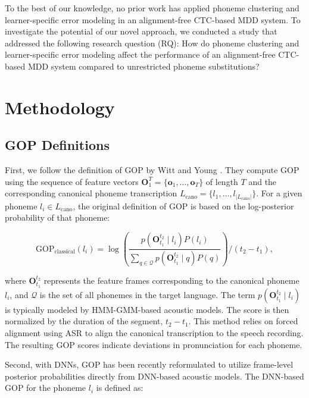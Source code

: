 \documentclass{Interspeech}
\begin{document}
To the best of our knowledge, no prior work has applied phoneme clustering and learner-specific error modeling in an alignment-free CTC-based MDD system. To investigate the potential of our novel approach, we conducted a study that addressed the following research question (RQ): How do phoneme clustering and learner-specific error modeling affect the performance of an alignment-free CTC-based MDD system compared to unrestricted phoneme substitutions?



\section{Methodology}

\subsection{GOP Definitions}
First, we follow the definition of GOP by Witt and Young \cite{witt2000use}. They compute GOP using the sequence of feature vectors \( \mathbf{O}_1^T = \{\mathbf{o}_1, \ldots, \mathbf{o}_T\} \) of length \( T \) and the corresponding canonical phoneme transcription \( L_{\text{cano}} = \{l_1, \ldots, l_{|L_{\text{cano}}|}\} \). For a given phoneme \( l_i \in L_{\text{cano}} \), the original definition of GOP is based on the log-posterior probability of that phoneme:

\begin{equation}
\text{GOP}_{\text{classical}}(l_i) = \log \left( \frac{p(\mathbf{O}_{t_1}^{t_2} \mid l_i) P(l_i)}{\sum_{q \in \mathcal{Q}} p(\mathbf{O}_{t_1}^{t_2} \mid q ) P(q)} \right) \bigg/ (t_2 - t_1),
\label{eq:gop_classical}
\end{equation}

where \( \mathbf{O}_{t_1}^{t_2} \) represents the feature frames corresponding to the canonical phoneme \( l_i \), and \( \mathcal{Q} \) is the set of all phonemes in the target language. The term \( p(\mathbf{O}_{t_1}^{t_2} \mid l_i)\) is typically modeled by HMM-GMM-based acoustic models. The score is then normalized by the duration of the segment, \( t_2 - t_1 \). This method relies on forced alignment using ASR to align the canonical transcription to the speech recording. The resulting GOP scores indicate deviations in pronunciation for each phoneme.


Second, with DNNs, GOP has been recently reformulated to utilize frame-level posterior probabilities directly from DNN-based acoustic models. The DNN-based GOP for the phoneme \( l_i \) is defined as:
\end{document}
